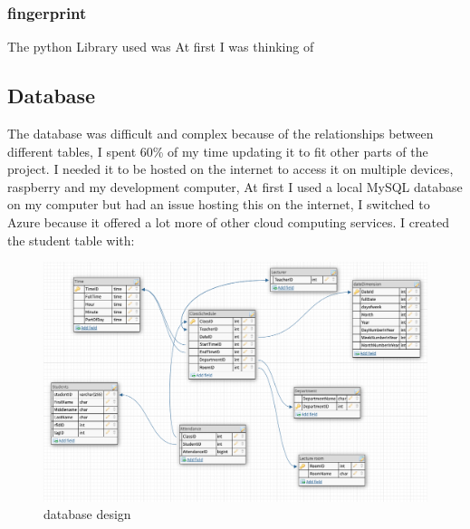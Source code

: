 \subsubsection{fingerprint}
The python Library used was 
At first I was thinking of 



\subsection{Database}
The database was difficult and complex because of the relationships between different tables, I spent 60\% of my time updating it to fit other parts of the project. I needed it to be hosted on the internet to access it on multiple devices, raspberry and my development computer, At first I used a local MySQL database on my computer but had an issue hosting this on the internet, I switched to Azure because it offered a lot more of other cloud computing services. I created the student table with:

\begin{figure}[ht]
  \includegraphics[scale=0.4]{Design & Implementation/images/database_design.png}
  \caption{database design}
\end{figure}
